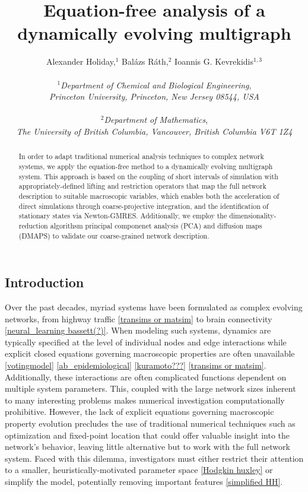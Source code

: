 \documentclass[12pt]{article}
\title{\vspace{-5mm}Equation-free analysis of a dynamically evolving multigraph}
\author{Alexander Holiday,$^1$ Bal\'{a}zs R\'{a}th,$^2$ Ioannis G. Kevrekidis$^{1,3}$ \\ \\
  $^1$\textit{Department of Chemical and Biological Engineering}, \\
  \textit{Princeton University, Princeton, New Jersey 08544, USA} \\ \\
  $^2$\textit{Department of Mathematics}, \\
  \textit{The University of British Columbia, Vancouver, British Columbia V6T 1Z4}
}
\date{}
\begin{document}
\maketitle
\begin{onehalfspace}

\begin{abstract}
In order to adapt traditional numerical analysis techniques to complex network systems, we apply the equation-free method to a dynamically evolving multigraph system. This approach is based on the coupling of short intervals of simulation with appropriately-defined lifting and restriction operators that map the full network description to suitable macroscopic variables, which enables both the acceleration of direct simulations through coarse-projective integration, and the identification of stationary states via Newton-GMRES. Additionally, we employ the dimensionality-reduction algorithsm principal componenet analysis (PCA) and diffusion maps (DMAPS) to validate our coarse-grained network description.
\end{abstract}

\pagebreak

\section{Introduction}
\label{sec:intro}


Over the past decades, myriad systems have been formulated as complex evolving networks, from highway traffic \ref{transims or matsim} to brain connectivity \ref{neural_learning bassett(?)}. When modeling such systems, dynamics are typically specified at the level of individual nodes and edge interactions while explicit closed equations governing macroscopic properties are often unavailable \ref{votingmodel} \ref{ab_epidemiological} \ref{kuramoto???} \ref{transims or matsim}. Additionally, these interactions are often complicated functions dependent on multiple system parameters. This, coupled with the large network sizes inherent to many interesting problems makes numerical investigation computationally prohibitive. However, the lack of explicit equations governing macroscopic property evolution precludes the use of traditional numerical techniques such as optimization and fixed-point location that could offer valuable insight into the network's behavior, leaving little alternative but to work with the full network system. Faced with this dilemma, investigators must either restrict their attention to a smaller, heuristically-motivated parameter space \ref{Hodgkin huxley} or simplify the model, potentially removing important features \ref{simplified HH}. \par


\end{onehalfspace}
\end{document}
